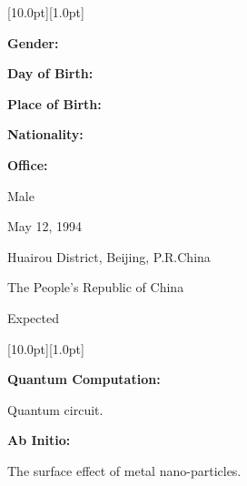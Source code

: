 \documentclass[12pt,a4paper,utf8]{report}
\begin{document}
\begin{minipage}[t]{16cm}
    \colorbox{subtitlecolor}{\raisebox{0pt}[10.0pt][1.0pt]{
        \textcolor{white}{\textsf{}}}}
\end{minipage}\par
\vspace{0.2cm}
    \begin{minipage}[t]{4cm}
        \qquad \textbf{Gender:}\par
        \qquad \textbf{Day of Birth:}\par
        \qquad \textbf{Place of Birth:}\par
        \qquad \textbf{Nationality:}\par
        \qquad \textbf{Office:}\par
    \end{minipage}
    \begin{minipage}[t]{12cm}
        Male \par
        May 12, 1994 \par
        Huairou District, Beijing, P.R.China \par
        The People's Republic of China \par
        Expected \par
    \end{minipage}\par
\vspace{0.4cm}

\begin{minipage}[t]{16cm}
    \colorbox{subtitlecolor}{\raisebox{0pt}[10.0pt][1.0pt]{
        \textcolor{white}{\textsf{}}}}
\end{minipage}\par
\vspace{0.2cm}\hspace{0.5cm}
    \begin{minipage}[t]{15.0cm}
        {\textbf{Quantum Computation:}}\par
        \quad Quantum circuit. \par
    \vspace{0.2cm}
        {\textbf{Ab Initio:}}\par
        \quad The surface effect of metal nano-particles.
    \end{minipage}\par
\vspace{0.4cm}
\end{document}
